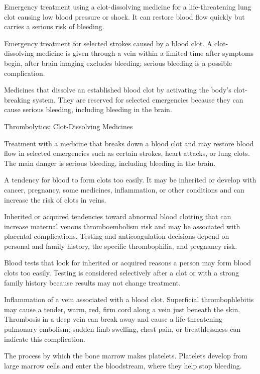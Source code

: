  Emergency treatment using a clot-dissolving medicine for a life-threatening lung clot causing low blood pressure or shock. It can restore blood flow quickly but carries a serious risk of bleeding.

 Emergency treatment for selected strokes caused by a blood clot. A clot-dissolving medicine is given through a vein within a limited time after symptoms begin, after brain imaging excludes bleeding; serious bleeding is a possible complication.

 Medicines that dissolve an established blood clot by activating the body’s clot-breaking system. They are reserved for selected emergencies because they can cause serious bleeding, including bleeding in the brain.

\synonyms
Thrombolytics; Clot-Dissolving Medicines

 Treatment with a medicine that breaks down a blood clot and may restore blood flow in selected emergencies such as certain strokes, heart attacks, or lung clots. The main danger is serious bleeding, including bleeding in the brain.

 A tendency for blood to form clots too easily. It may be inherited or develop with cancer, pregnancy, some medicines, inflammation, or other conditions and can increase the risk of clots in veins.

 Inherited or acquired tendencies toward abnormal blood clotting that can increase maternal venous thromboembolism risk and may be associated with placental complications. Testing and anticoagulation decisions depend on personal and family history, the specific thrombophilia, and pregnancy risk.

 Blood tests that look for inherited or acquired reasons a person may form blood clots too easily. Testing is considered selectively after a clot or with a strong family history because results may not change treatment.

 Inflammation of a vein associated with a blood clot. Superficial thrombophlebitis may cause a tender, warm, red, firm cord along a vein just beneath the skin. Thrombosis in a deep vein can break away and cause a life-threatening pulmonary embolism; sudden limb swelling, chest pain, or breathlessness can indicate this complication.

 The process by which the bone marrow makes platelets. Platelets develop from large marrow cells and enter the bloodstream, where they help stop bleeding.

